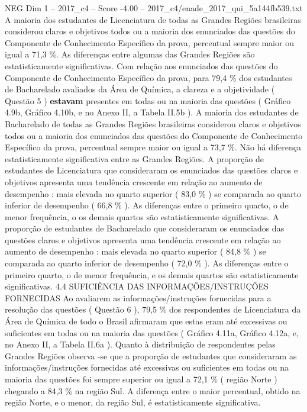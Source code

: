 \begin{textsample}{NEG Dim 1 – 2017\_c4 – Score -4.00 – 2017\_c4/enade\_2017\_qui\_5a144fb539.txt}
A maioria dos estudantes de Licenciatura de todas as Grandes Regiões brasileiras considerou claros e objetivos todos ou a maioria dos enunciados das questões do Componente de Conhecimento Específico da prova, percentual sempre maior ou igual a 71,3 \%.
As diferenças entre algumas das Grandes Regiões são estatisticamente significativas.
Com relação aos enunciados das questões do Componente de Conhecimento Específico da prova, para 79,4 \% dos estudantes de Bacharelado avaliados da Área de Química, a clareza e a objetividade ( Questão 5 ) \textbf{estavam} presentes em todas ou na maioria das questões ( Gráfico 4.9b, Gráfico 4.10b, e no Anexo II, a Tabela II.5b ).
A maioria dos estudantes de Bacharelado de todas as Grandes Regiões brasileiras considerou claros e objetivos todos ou a maioria dos enunciados das questões do Componente de Conhecimento Específico da prova, percentual sempre maior ou igual a 73,7 \%.
Não há diferença estatisticamente significativa entre as Grandes Regiões.
A proporção de estudantes de Licenciatura que consideraram os enunciados das questões claros e objetivos apresenta uma tendência crescente em relação ao aumento de desempenho : mais elevada no quarto superior ( 83,0 \% ) se comparada ao quarto inferior de desempenho ( 66,8 \% ).
As diferenças entre o primeiro quarto, o de menor frequência, o os demais quartos são estatisticamente significativas.
A proporção de estudantes de Bacharelado que consideraram os enunciados das questões claros e objetivos apresenta uma tendência crescente em relação ao aumento de desempenho : mais elevada no quarto superior ( 84,8 \% ) se comparada ao quarto inferior de desempenho ( 72,0 \% ).
As diferenças entre o primeiro quarto, o de menor frequência, e os demais quartos são estatisticamente significativas. 4.4 SUFICIÊNCIA DAS INFORMAÇÕES/INSTRUÇÕES FORNECIDAS Ao avaliarem as informações/instruções fornecidas para a resolução das questões ( Questão 6 ), 79,5 \% dos respondentes de Licenciatura da Área de Química de todo o Brasil afirmaram que estas eram até excessivas ou suficientes em todas ou na maioria das questões ( Gráfico 4.11a, Gráfico 4.12a, e, no Anexo II, a Tabela II.6a ).
Quanto à distribuição de respondentes pelas Grandes Regiões observa -se que a proporção de estudantes que consideraram as informações/instruções fornecidas até excessivas ou suficientes em todas ou na maioria das questões foi sempre superior ou igual a 72,1 \% ( região Norte ) chegando a 84,3 \% na região Sul.
A diferença entre o maior percentual, obtido na região Norte, e o menor, da região Sul, é estatisticamente significativa.

\end{textsample}
